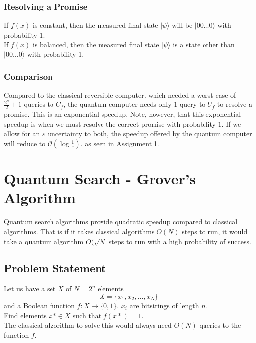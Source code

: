 \documentclass{article}
\begin{document}
\subsubsection{Resolving a Promise}
If $f(x)$ is constant, then the measured final state $| \psi \rangle$ will be $|00 \hdots 0\rangle$ with probability 1.\\
If $f(x)$ is balanced, then the measured final state $| \psi \rangle$ is a state other than $|00 \hdots 0\rangle$ with probability 1.

\subsubsection{Comparison}
Compared to the classical reversible computer, which needed a worst case of $\frac{2^n}{2} + 1$ queries to $C_f$, the quantum computer needs only $1$ query to $U_f$ to resolve a promise. This is an exponential speedup. Note, however, that this exponential speedup is when we must resolve the correct promise with probability $1$. If we allow for an $\varepsilon$ uncertainty to both, the speedup offered by the quantum computer will reduce to $\mathcal{O}(\log{\frac{1}{\varepsilon}})$, as seen in Assignment 1.


\section{Quantum Search - Grover's Algorithm}

Quantum search algorithms provide quadratic speedup compared to classical algorithms. That is if
it takes classical algorithms $O(N)$ steps to run, it would take a quantum algorithm $O(\sqrt{N}$
steps to run with a high probability of success.

\subsection{Problem Statement}

Let us have a set $X$ of $N=2^n$ elements
$$X = \{x_1, x_2, ... ,x_N\}$$
and a Boolean function $f: X \rightarrow \{0, 1\}$.
$x_i$ are bitstrings of length $n$. \\
Find elements $x* \in X$ such that $f(x*) = 1$. \\

The classical algorithm to solve this would always need $O(N)$ queries to the function $f$.\\
\end{document}
